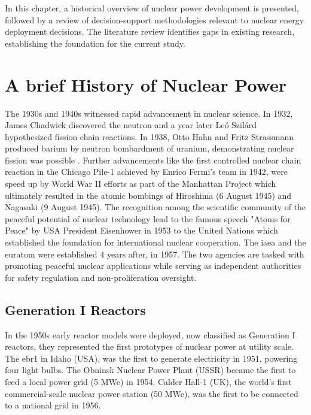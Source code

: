 \label{sec:literature}
In this chapter, a historical overview of nuclear power development is presented, followed by a review of decision-support methodologies relevant to nuclear energy deployment decisions. The literature review identifies gaps in existing research, establishing the foundation for the current study.

\section{A brief History of Nuclear Power}
\label{sec:history_nuclear_power}
The 1930s and 1940s witnessed rapid advancement in nuclear science. In 1932, James Chadwick discovered the neutron \cite{Chadwick_Neutron_1932} and a year later Le\'o Szil\'ard hypothesized fission chain reactions. In 1938, Otto Hahn and Fritz Strassmann produced barium by neutron bombardment of uranium, demonstrating nuclear fission was possible \cite{Hahn_Strassmann_1939}. Further advancements like the first controlled nuclear chain reaction in the Chicago Pile-1 achieved by Enrico Fermi's team in 1942, were speed up by World War II efforts as part of the Manhattan Project which ultimately resulted in the atomic bombings of Hiroshima (6 August 1945) and Nagasaki (9 August 1945). The recognition among the scientific community of the peaceful potential of nuclear technology lead to the famous speech "Atoms for Peace" by USA President Eisenhower in 1953 to the United Nations \cite{Eisenhower_Atoms_for_Peace_1953} which established the foundation for international nuclear cooperation. The \gls{iaea} and the \gls{euratom} were established 4 years after, in 1957. The two agencies are tasked with promoting peaceful nuclear applications while serving as independent authorities for safety regulation and non-proliferation oversight.

\subsection{Generation I Reactors}
In the 1950s early reactor models were deployed, now classified as Generation I reactors, they represented the first prototypes of nuclear power at utility scale. The \gls{ebr1} in Idaho (USA), was the first to generate electricity in 1951, powering four light bulbs. The Obninsk Nuclear Power Plant (USSR) became the first to feed a local power grid (5 MWe) in 1954. Calder Hall-1 (UK), the world's first commercial-scale nuclear power station (50 MWe), was the first to be connected to a national grid in 1956.

